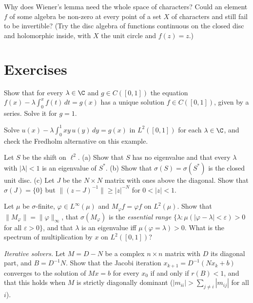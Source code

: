 \begin{think}
Why does Wiener's lemma need the whole space of characters? Could an element $f$ of some algebra be non-zero at every point of a set $X$ of characters and still fail to be invertible? (Try the disc algebra of functions continuous on
the closed disc and holomorphic inside, with $X$ the unit circle and $f(z)=z$.)
\end{think}

\section{Exercises}

\begin{exercise}[$\star$]\label{ex:volterraeq}
Show that for every $\lambda\in\C$ and $g\in C([0,1])$ the equation $f(x)-\lambda\int_0^xf(t)\,dt=g(x)$ has a unique solution $f\in C([0,1])$, given by a series. Solve it for $g=1$.
\end{exercise}

\begin{exercise}[$\star$]\label{ex:fredholmrank1}
Solve $u(x)-\lambda\int_0^1xy\,u(y)\,dy=g(x)$ in $L^2([0,1])$ for each $\lambda\in\C$, and check the Fredholm alternative on this example.
\end{exercise}

\begin{exercise}[$\star\star$]\label{ex:shift}
Let $S$ be the shift on $\ell^2$. (a) Show that $S$ has no eigenvalue and that every $\lambda$ with $|\lambda|<1$ is an eigenvalue of $S^*$. (b) Show that $\sigma(S)=\sigma(S^*)$ is the closed unit disc. (c) Let $J$ be the $N\times N$ matrix
with ones above the diagonal. Show that $\sigma(J)=\{0\}$ but $\|(z-J)^{-1}\|\ge|z|^{-N}$ for $0<|z|<1$.
\end{exercise}

\begin{exercise}[$\star\star$]\label{ex:multiplication}
Let $\mu$ be $\sigma$-finite, $\varphi\in L^\infty(\mu)$ and $M_\varphi f=\varphi f$ on $L^2(\mu)$. Show that $\|M_\varphi\|=\|\varphi\|_\infty$, that $\sigma(M_\varphi)$ is the \emph{essential range} $\{\lambda:\mu(|\varphi-\lambda|<\varepsilon)>0$ for all
$\varepsilon>0\}$, and that $\lambda$ is an eigenvalue iff $\mu(\varphi=\lambda)>0$. What is the spectrum of multiplication by $x$ on $L^2([0,1])$?
\end{exercise}

\begin{exercise}[$\star$]\label{ex:jacobi}
\emph{Iterative solvers.} Let $M=D-N$ be a complex $n\times n$ matrix with $D$ its diagonal part, and $B=D^{-1}N$. Show that the Jacobi iteration $x_{k+1}=D^{-1}(Nx_k+b)$ converges to the solution of $Mx=b$ for every $x_0$ if and only if
$r(B)<1$, and that this holds when $M$ is strictly diagonally dominant ($|m_{ii}|>\sum_{j\ne i}|m_{ij}|$ for all $i$).
\end{exercise}

